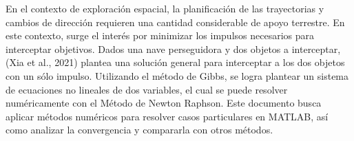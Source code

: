 En el contexto de exploración espacial, la planificación de las trayectorias y
cambios de dirección requieren una cantidad considerable de apoyo terrestre. En
este contexto, surge el interés por minimizar los impulsos necesarios para
interceptar objetivos. Dados una nave perseguidora y dos objetos a interceptar,
(Xia et al., 2021) plantea una solución general para interceptar a los dos
objetos con un sólo impulso. Utilizando el método de Gibbs, se logra plantear
un sistema de ecuaciones no lineales de dos variables, el cual se puede
resolver numéricamente con el Método de Newton Raphson. Este documento busca
aplicar métodos numéricos para resolver casos particulares en MATLAB, así como
analizar la convergencia y compararla con otros métodos.